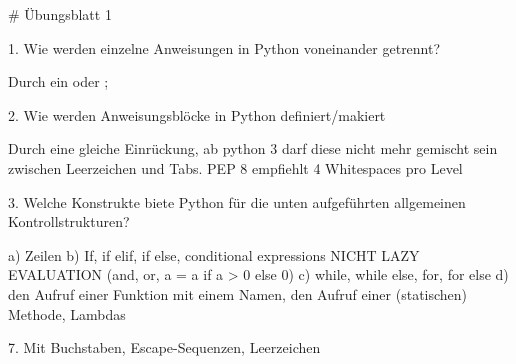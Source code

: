# Übungsblatt 1

1. Wie werden einzelne Anweisungen in Python voneinander getrennt?

Durch ein \n oder ;

2. Wie werden Anweisungsblöcke in Python definiert/makiert

Durch eine gleiche Einrückung, ab python 3 darf diese nicht mehr gemischt sein zwischen Leerzeichen und Tabs. PEP 8 empfiehlt 4 Whitespaces pro Level

3. Welche Konstrukte biete Python für die unten aufgeführten allgemeinen Kontrollstrukturen?

a) Zeilen
b) If, if elif, if else, conditional expressions NICHT LAZY EVALUATION (and, or, a = a if a > 0 else 0)
c) while, while else, for, for else
d) den Aufruf einer Funktion mit einem Namen, den Aufruf einer (statischen) Methode, Lambdas

7. Mit Buchstaben, Escape-Sequenzen, Leerzeichen
